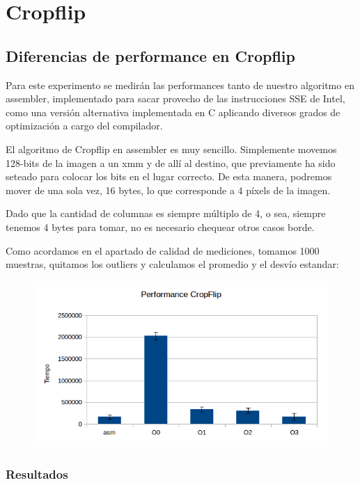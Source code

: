 \documentclass[a4paper]{article}
\begin{document}
\newpage

\section{Cropflip}

\subsection{Diferencias de performance en Cropflip}
Para este experimento se medirán las performances tanto de nuestro algoritmo en assembler, implementado para sacar provecho de las instrucciones SSE de Intel, como una versión alternativa implementada en C aplicando diversos grados de optimización a cargo del compilador.

El algoritmo de Cropflip en assembler es muy sencillo. Simplemente movemos 128-bits de la imagen a un xmm y de allí al destino, que previamente ha sido seteado para colocar los bits en el lugar correcto. De esta manera, podremos mover de una sola vez, 16 bytes, lo que corresponde a 4 píxels de la imagen.

Dado que la cantidad de columnas es siempre múltiplo de 4, o sea, siempre tenemos 4 bytes para tomar, no es necesario chequear otros casos borde.

Como acordamos en el apartado de calidad de mediciones, tomamos 1000 muestras, quitamos los outliers y calculamos el promedio y el desvío estandar:

\begin{figure}[h!]
  \begin{center}
	\includegraphics[scale=0.66]{Graficos1.4/crop/per.jpg}
	\label{nombreparareferenciar5}
  \end{center}
\end{figure}

\subsubsection{Resultados}
\end{document}
